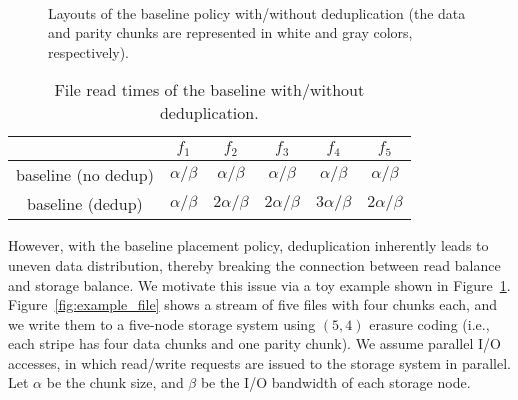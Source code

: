 \begin{figure}[!h]
\centering
{}
\\
\caption{Layouts of the baseline policy with/without deduplication (the data
and parity chunks are represented in white and gray colors, respectively).}
\label{fig:example}
\end{figure}

\begin{table}[!t]
\caption{File read times of the baseline with/without deduplication.}
\vspace{10pt}
\centering
\label{tab:result_read}
\begin{tabular}{cccccc}
\hline
 &   $f_1$  &  $f_2$     &   $f_3$       &  $f_4$  & $f_5$ \\\hline
 baseline (no dedup) & $\alpha/\beta$ & $\alpha/\beta$ & $\alpha/\beta$ & $\alpha/\beta$ & $\alpha/\beta$    \\\hline
 baseline (dedup)    & $\alpha/\beta$ & $2\alpha/\beta$ & $2\alpha/\beta$ & $3\alpha/\beta$& $2\alpha/\beta$  \\\hline
\end{tabular}
\end{table}

However, with the baseline placement policy, deduplication inherently leads to
uneven data distribution, thereby breaking the connection between read balance
and storage balance.  We motivate this issue via a toy example shown in
Figure~\ref{fig:example}.  Figure~\ref{fig:example_file} shows a stream of
five files with four chunks each, and we write them to a five-node storage
system using $(5,4)$ erasure coding (i.e., each stripe has four data chunks
and one parity chunk).  We assume parallel I/O accesses, in which read/write
requests are issued to the storage system in parallel.  Let $\alpha$ be the
chunk size, and $\beta$ be the I/O bandwidth of each storage node.  


